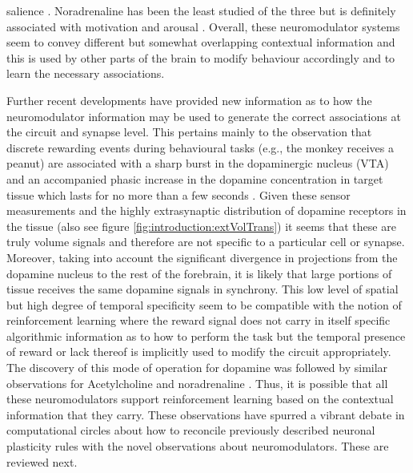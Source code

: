 salience \cite{pinto2013fast}. Noradrenaline has been the least studied of the three but is definitely associated with motivation and arousal \cite{carter2010tuning}. Overall, these neuromodulator systems seem to convey different but somewhat overlapping contextual information and this is used by other parts of the brain to modify behaviour accordingly and to learn the necessary associations.

    Further recent developments have provided new information as to how the neuromodulator information may be used to generate the correct associations at the circuit and synapse level. This pertains mainly to the observation that discrete rewarding events during behavioural tasks (e.g., the monkey receives a peanut) are associated with a sharp burst in the dopaminergic nucleus (VTA) and an accompanied phasic increase in the dopamine concentration in target tissue which lasts for no more than a few seconds \cite{schultz1997neural,venton2003real,arbuthnott2007space}. Given these sensor measurements and the highly extrasynaptic distribution of dopamine receptors in the tissue \cite{rice2008dopamine,taber2014volume} (also see figure \ref{fig:introduction:extVolTrans}) it seems that these are truly volume signals and therefore are not specific to a particular cell or synapse. Moreover, taking into account the significant divergence in projections from the dopamine nucleus to the rest of the forebrain, it is likely that large portions of tissue receives the same dopamine signals in synchrony. This low level of spatial but high degree of temporal specificity seem to be compatible with the notion of reinforcement learning where the reward signal does not carry in itself specific algorithmic information as to how to perform the task but the temporal presence of reward or lack thereof is implicitly used to modify the circuit appropriately. The discovery of this mode of operation for dopamine was followed by similar observations for Acetylcholine \cite{sarter2009phasic} and noradrenaline \cite{dugast2002vivo}. Thus, it is possible that all these neuromodulators support reinforcement learning based on the contextual information that they carry. These observations have spurred a vibrant debate in computational circles about how to reconcile previously described neuronal plasticity rules with the novel observations about neuromodulators. These are reviewed next.

